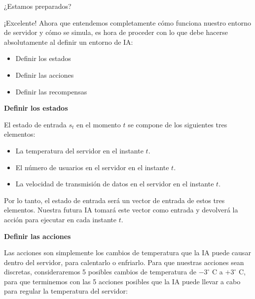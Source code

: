 \documentclass[]{book}
\providecommand{\tightlist}{%
  \setlength{\itemsep}{0pt}\setlength{\parskip}{0pt}}
\begin{document}
¿Estamos preparados?

¡Excelente! Ahora que entendemos completamente cómo funciona nuestro entorno de servidor y cómo se simula, es hora de proceder con lo que debe hacerse absolutamente al definir un entorno de IA:

\begin{itemize}
\tightlist
\item
  Definir los estados
\item
  Definir las acciones
\item
  Definir las recompensas
\end{itemize}

\textbf{Definir los estados}

El estado de entrada \(s_t\) en el momento \(t\) se compone de los siguientes tres elementos:

\begin{itemize}
\tightlist
\item
  La temperatura del servidor en el instante \(t\).
\item
  El número de usuarios en el servidor en el instante \(t\).
\item
  La velocidad de transmisión de datos en el servidor en el instante \(t\).
\end{itemize}

Por lo tanto, el estado de entrada será un vector de entrada de estos tres elementos. Nuestra futura IA tomará este vector como entrada y devolverá la acción para ejecutar en cada instante \(t\).

\textbf{Definir las acciones}

Las acciones son simplemente los cambios de temperatura que la IA puede causar dentro del servidor, para calentarlo o enfriarlo. Para que nuestras acciones sean discretas, consideraremos 5 posibles cambios de temperatura de \(-3^{\circ}\) C a \(+ 3^{\circ}\) C, para que terminemos con las 5 acciones posibles que la IA puede llevar a cabo para regular la temperatura del servidor:
\end{document}
